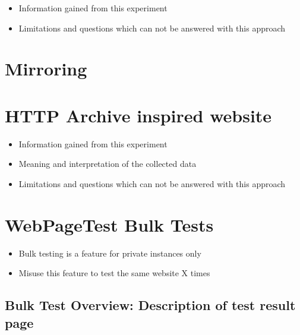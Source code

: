 \begin{itemize}
\item Information gained from this experiment
\item Limitations and questions which can not be answered with this approach
\end{itemize}


\section{Mirroring}


\section{HTTP Archive inspired website}

\begin{itemize}
\item Information gained from this experiment
\item Meaning and interpretation of the collected data
\item Limitations and questions which can not be answered with this approach
\end{itemize}




\section{WebPageTest Bulk Tests}

\begin{itemize}
\item Bulk testing is a feature for private instances only
\item Misuse this feature to test the same website X times
\end{itemize}


\subsection{Bulk Test Overview: Description of test result page}

